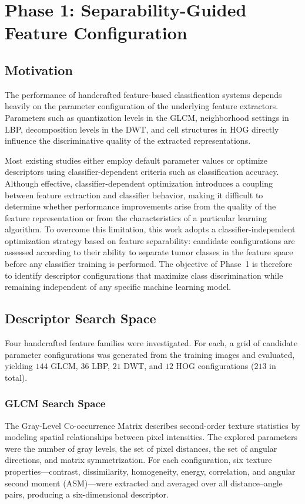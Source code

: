 \section{Phase 1: Separability-Guided Feature Configuration}
\label{sec:phase1}
\label{sec:phase1_method}

\subsection{Motivation}
\label{sec:phase1_motivation}

The performance of handcrafted feature-based classification systems depends
heavily on the parameter configuration of the underlying feature extractors.
Parameters such as quantization levels in the GLCM, neighborhood settings in
LBP, decomposition levels in the DWT, and cell structures in HOG directly
influence the discriminative quality of the extracted representations.

Most existing studies either employ default parameter values or optimize
descriptors using classifier-dependent criteria such as classification
accuracy. Although effective, classifier-dependent optimization introduces a
coupling between feature extraction and classifier behavior, making it difficult
to determine whether performance improvements arise from the quality of the
feature representation or from the characteristics of a particular learning
algorithm. To overcome this limitation, this work adopts a
classifier-independent optimization strategy based on feature separability:
candidate configurations are assessed according to their ability to separate
tumor classes in the feature space before any classifier training is performed.
The objective of Phase~1 is therefore to identify descriptor configurations that
maximize class discrimination while remaining independent of any specific
machine learning model.

\subsection{Descriptor Search Space}
\label{sec:phase1_search}

Four handcrafted feature families were investigated. For each, a grid of
candidate parameter configurations was generated from the training images and
evaluated, yielding $144$ GLCM, $36$ LBP, $21$ DWT, and $12$ HOG configurations
($213$ in total).

\subsubsection{GLCM Search Space}
The Gray-Level Co-occurrence Matrix describes second-order texture statistics by
modeling spatial relationships between pixel intensities. The explored
parameters were the number of gray levels, the set of pixel distances, the set
of angular directions, and matrix symmetrization. For each configuration, six
texture properties---contrast, dissimilarity, homogeneity, energy, correlation,
and angular second moment (ASM)---were extracted and averaged over all
distance--angle pairs, producing a six-dimensional descriptor.

